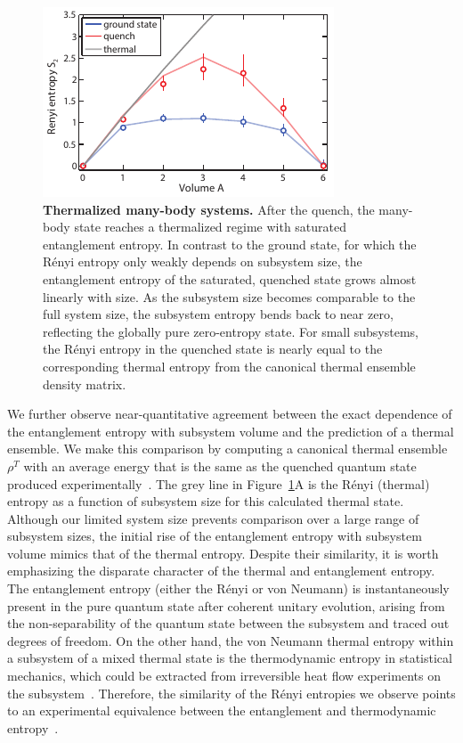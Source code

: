 \begin{figure}
	\centering
	\includegraphics[scale=1.5]{figures/ETH_volumeLaw.pdf}
	\caption{{\bf Thermalized many-body systems.} After the quench, the many-body state reaches a thermalized regime with saturated entanglement entropy. In contrast to the ground state, for which the R\'{e}nyi entropy only weakly depends on subsystem size, the entanglement entropy of the saturated, quenched state grows almost linearly with size. As the subsystem size becomes comparable to the full system size, the subsystem entropy bends back to near zero, reflecting the globally pure zero-entropy state. For small subsystems, the R\'{e}nyi entropy in the quenched state is nearly equal to the corresponding thermal entropy from the canonical thermal ensemble density matrix.}
	\label{fig:volume}
\end{figure}

We further observe near-quantitative agreement between the exact dependence of the entanglement entropy with subsystem volume and the prediction of a thermal ensemble. We make this comparison by computing a canonical thermal ensemble $\rho^T$ with an average energy that is the same as the quenched quantum state produced experimentally~\cite{Grover2015}. The grey line in Figure~\ref{fig:volume}A is the R\'{e}nyi (thermal) entropy as a function of subsystem size for this calculated thermal state. Although our limited system size prevents comparison over a large range of subsystem sizes, the initial rise of the entanglement entropy with subsystem volume mimics that of the thermal entropy. Despite their similarity, it is worth emphasizing the disparate character of the thermal and entanglement entropy. The entanglement entropy (either the R\'{e}nyi or von Neumann) is instantaneously present in the pure quantum state after coherent unitary evolution, arising from the non-separability of the quantum state between the subsystem and traced out degrees of freedom. On the other hand, the von Neumann thermal entropy within a subsystem of a mixed thermal state is the thermodynamic entropy in statistical mechanics, which could be extracted from irreversible heat flow experiments on the subsystem~\cite{Deutsch2013}. Therefore, the similarity of the R\'{e}nyi  entropies we observe points to an experimental equivalence between the entanglement and thermodynamic entropy~\cite{Grover2014,Grover2015}.

